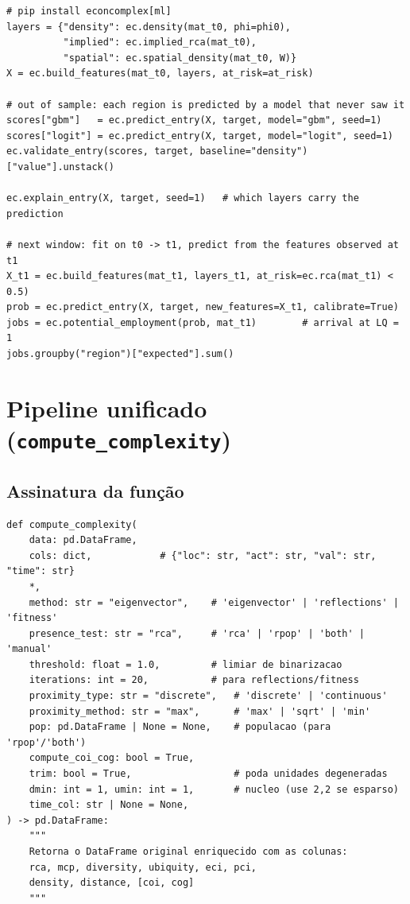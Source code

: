 \documentclass[12pt, a4paper]{article}
\begin{document}
\begin{lstlisting}[caption={Das densidades a um modelo de previs\~{a}o e ao emprego esperado}]
# pip install econcomplex[ml]
layers = {"density": ec.density(mat_t0, phi=phi0),
          "implied": ec.implied_rca(mat_t0),
          "spatial": ec.spatial_density(mat_t0, W)}
X = ec.build_features(mat_t0, layers, at_risk=at_risk)

# out of sample: each region is predicted by a model that never saw it
scores["gbm"]   = ec.predict_entry(X, target, model="gbm", seed=1)
scores["logit"] = ec.predict_entry(X, target, model="logit", seed=1)
ec.validate_entry(scores, target, baseline="density")["value"].unstack()

ec.explain_entry(X, target, seed=1)   # which layers carry the prediction

# next window: fit on t0 -> t1, predict from the features observed at t1
X_t1 = ec.build_features(mat_t1, layers_t1, at_risk=ec.rca(mat_t1) < 0.5)
prob = ec.predict_entry(X, target, new_features=X_t1, calibrate=True)
jobs = ec.potential_employment(prob, mat_t1)        # arrival at LQ = 1
jobs.groupby("region")["expected"].sum()
\end{lstlisting}

\section{Pipeline unificado (\texttt{compute\_complexity})}

\subsection{Assinatura da fun\c{c}\~{a}o}

\begin{lstlisting}[caption={Assinatura da fun\c{c}\~{a}o pipeline}]
def compute_complexity(
    data: pd.DataFrame,
    cols: dict,            # {"loc": str, "act": str, "val": str, "time": str}
    *,
    method: str = "eigenvector",    # 'eigenvector' | 'reflections' | 'fitness'
    presence_test: str = "rca",     # 'rca' | 'rpop' | 'both' | 'manual'
    threshold: float = 1.0,         # limiar de binarizacao
    iterations: int = 20,           # para reflections/fitness
    proximity_type: str = "discrete",   # 'discrete' | 'continuous'
    proximity_method: str = "max",      # 'max' | 'sqrt' | 'min'
    pop: pd.DataFrame | None = None,    # populacao (para 'rpop'/'both')
    compute_coi_cog: bool = True,
    trim: bool = True,                  # poda unidades degeneradas
    dmin: int = 1, umin: int = 1,       # nucleo (use 2,2 se esparso)
    time_col: str | None = None,
) -> pd.DataFrame:
    """
    Retorna o DataFrame original enriquecido com as colunas:
    rca, mcp, diversity, ubiquity, eci, pci,
    density, distance, [coi, cog]
    """
\end{lstlisting}
\end{document}
